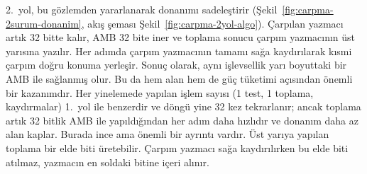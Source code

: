 2.\ yol, bu gözlemden yararlanarak donanımı sadeleştirir (Şekil~\ref{fig:carpma-2surum-donanim}, akış şeması Şekil~\ref{fig:carpma-2yol-algo}). Çarpılan yazmacı artık 32 bitte kalır, AMB 32 bite iner ve toplama sonucu çarpım yazmacının üst yarısına yazılır. Her adımda çarpım yazmacının tamamı sağa kaydırılarak kısmi çarpım doğru konuma yerleşir. Sonuç olarak, aynı işlevsellik yarı boyuttaki bir AMB ile sağlanmış olur. Bu da hem alan hem de güç tüketimi açısından önemli bir kazanımdır. Her yinelemede yapılan işlem sayısı (1 test, 1 toplama, kaydırmalar) 1.\ yol ile benzerdir ve döngü yine 32 kez tekrarlanır; ancak toplama artık 32 bitlik AMB ile yapıldığından her adım daha hızlıdır ve donanım daha az alan kaplar. Burada ince ama önemli bir ayrıntı vardır. Üst yarıya yapılan toplama bir elde biti üretebilir. Çarpım yazmacı sağa kaydırılırken bu elde biti atılmaz, yazmacın en soldaki bitine içeri alınır.

